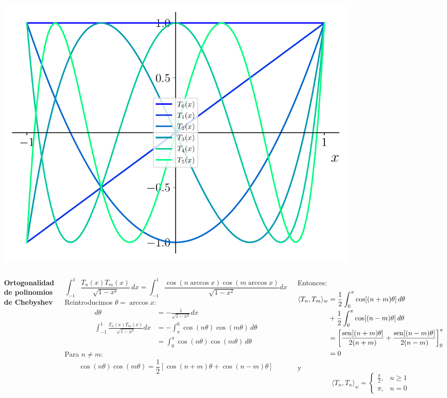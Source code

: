 \documentclass[9pt, aspectratio=169]{beamer}
\begin{document}
\begin{frame}
\begin{columns}[t]
		\begin{center}
			\includegraphics[width=0.8\textwidth]{figs/fig-11.pdf}
		\end{center}
	\end{columns}
\end{frame}

\begin{frame}
	\begin{columns}[t]
		\cx
		\textbf{ Ortogonalidad de polinomios de Chebyshev }

		\[ \int_{-1}^1 \frac{T_n(x) T_m(x)}{\sqrt{1 - x²}} \, dx = \int_{-1}^1 \frac{\cos(n \arccos x) \cos(m \arccos x)}{\sqrt{1 - x^2}} dx \]
		Reintroducimos $\theta = \arccos x$:
		\begin{align*}
			d\theta                                              & = -\frac{1}{\sqrt{1 - x^2}} dx                            \\
			\int_{-1}^1 \frac{T_n(x) T_m(x)}{\sqrt {1 - x^2}} dx & = -\int_{\pi}^0 \cos(n \theta) \cos(m \theta) \, d\theta  \\
			                                                     & = \int_{0}^{\pi} \cos(n \theta) \cos(m \theta) \, d\theta
		\end{align*}
		Para $n \neq m$:
		\[ \cos(n \theta) \cos(m \theta) = \frac{1}{2}[\cos(n+m) \theta + \cos(n-m)\theta] \]

		\vspace{7em}

		Entonces:
		\begin{align*}
			\langle T_n, T_m \rangle_w & = \frac{1}{2} \int_0^{\pi} \cos[(n+m) \theta] \, d\theta                                       \\
			                           & +\frac{1}{2} \int_0^{\pi} \cos[(n-m) \theta] \, d\theta                                        \\
			                           & = \left[ \frac{\operatorname{sen}[(n+m) \theta]}{2(n+m)} + \frac{\operatorname{sen}[(n-m) \theta]}{2(n-m)} \right]_0^{\pi} \\
			                           & = 0
		\end{align*}
		y
		\[ \langle T_n, T_n \rangle_w =
			\begin{cases}
				\frac{\pi}{2}, & n \geq 1 \\
				\pi,           & n = 0
			\end{cases} \]
	\end{columns}
\end{frame}
\end{document}

